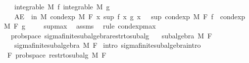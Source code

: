 \begin{isabellebody}
\ \ \ {\isachardoublequoteopen}integrable\ M\ f{\isachardoublequoteclose}\ {\isachardoublequoteopen}integrable\ M\ g{\isachardoublequoteclose}\isanewline
\ \ \ {\isachardoublequoteopen}AE\ {\isasymxi}\ in\ M{\isachardot}{\kern0pt}\ cond{\isacharunderscore}{\kern0pt}exp\ M\ F\ {\isacharparenleft}{\kern0pt}{\isasymlambda}x{\isachardot}{\kern0pt}\ sup\ {\isacharparenleft}{\kern0pt}f\ x{\isacharparenright}{\kern0pt}\ {\isacharparenleft}{\kern0pt}g\ x{\isacharparenright}{\kern0pt}{\isacharparenright}{\kern0pt}\ {\isasymxi}\ {\isasymge}\ sup\ {\isacharparenleft}{\kern0pt}cond{\isacharunderscore}{\kern0pt}exp\ M\ F\ f\ {\isasymxi}{\isacharparenright}{\kern0pt}\ {\isacharparenleft}{\kern0pt}cond{\isacharunderscore}{\kern0pt}exp\ M\ F\ g\ {\isasymxi}{\isacharparenright}{\kern0pt}{\isachardoublequoteclose}\isanewline
%
\isadelimproof
\ \ %
\endisadelimproof
%
\isatagproof
{}\isamarkupfalse%
\ sup{\isacharunderscore}{\kern0pt}max\ \isamarkupfalse%
\ assms\ \isamarkupfalse%
\ {\isacharparenleft}{\kern0pt}rule\ cond{\isacharunderscore}{\kern0pt}exp{\isacharunderscore}{\kern0pt}max{\isacharparenright}{\kern0pt}%
\endisatagproof
{\isafoldproof}%
%
\isadelimproof
\isanewline
%
\endisadelimproof
\isanewline
{}\isamarkupfalse%
%
\isadelimdocument
%
\endisadelimdocument
%
\isatagdocument
%
\isamarkuptrue%
%
\endisatagdocument
{\isafolddocument}%
%
\isadelimdocument
%
\endisadelimdocument
{}\isamarkupfalse%
\ {\isacharparenleft}{\kern0pt}\ prob{\isacharunderscore}{\kern0pt}space{\isacharparenright}{\kern0pt}\ sigma{\isacharunderscore}{\kern0pt}finite{\isacharunderscore}{\kern0pt}subalgebra{\isacharunderscore}{\kern0pt}restr{\isacharunderscore}{\kern0pt}to{\isacharunderscore}{\kern0pt}subalg{\isacharcolon}{\kern0pt}\isanewline
\ \ \ {\isachardoublequoteopen}subalgebra\ M\ F{\isachardoublequoteclose}\isanewline
\ \ \ {\isachardoublequoteopen}sigma{\isacharunderscore}{\kern0pt}finite{\isacharunderscore}{\kern0pt}subalgebra\ M\ F{\isachardoublequoteclose}\isanewline
%
\isadelimproof
%
\endisadelimproof
%
\isatagproof
{}\isamarkupfalse%
\ {\isacharparenleft}{\kern0pt}intro\ sigma{\isacharunderscore}{\kern0pt}finite{\isacharunderscore}{\kern0pt}subalgebra{\isachardot}{\kern0pt}intro{\isacharparenright}{\kern0pt}\isanewline
\ \ \isamarkupfalse%
\ F{\isacharcolon}{\kern0pt}\ prob{\isacharunderscore}{\kern0pt}space\ {\isachardoublequoteopen}restr{\isacharunderscore}{\kern0pt}to{\isacharunderscore}{\kern0pt}subalg\ M\ F{\isachardoublequoteclose}\ \isamarkupfalse%

\end{isabellebody}
